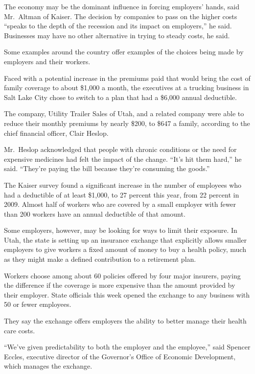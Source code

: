 ﻿\documentclass[12pt]{article}
\begin{document}
The economy may be the dominant influence in forcing employers' hands, said Mr.~Altman of Kaiser.
The decision by companies to pass on the higher costs ``speaks to the depth of the recession and its
impact on employers,'' he said. Businesses may have no other alternative in trying to steady costs,
he said.

Some examples around the country offer examples of the choices being made by employers and their
workers.

Faced with a potential increase in the premiums paid that would bring the cost of family coverage to
about \$1,000 a month, the executives at a trucking business in Salt Lake City chose to switch to a
plan that had a \$6,000 annual deductible.

The company, Utility Trailer Sales of Utah, and a related company were able to reduce their monthly
premiums by nearly \$200, to \$647 a family, according to the chief financial officer, Clair Heslop.

Mr.~Heslop acknowledged that people with chronic conditions or the need for expensive medicines had
felt the impact of the change. ``It's hit them hard,'' he said. ``They're paying the bill because
they're consuming the goods.''

The Kaiser survey found a significant increase in the number of employees who had a deductible of at
least \$1,000, to 27 percent this year, from 22 percent in 2009. Almost half of workers who are
covered by a small employer with fewer than 200 workers have an annual deductible of that amount.

Some employers, however, may be looking for ways to limit their exposure. In Utah, the state is
setting up an insurance exchange that explicitly allows smaller employers to give workers a fixed
amount of money to buy a health policy, much as they might make a defined contribution to a
retirement plan.

Workers choose among about 60 policies offered by four major insurers, paying the difference if the
coverage is more expensive than the amount provided by their employer. State officials this week
opened the exchange to any business with 50 or fewer employees.

They say the exchange offers employers the ability to better manage their health care costs.

``We've given predictability to both the employer and the employee,'' said Spencer Eccles, executive
director of the Governor's Office of Economic Development, which manages the exchange.
\end{document}
